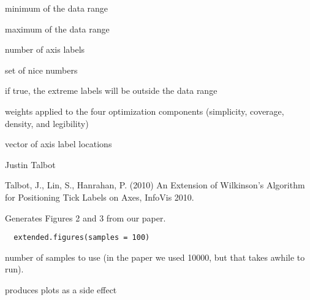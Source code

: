 \documentclass[letterpaper]{book}
\begin{document}
\begin{Arguments}
\begin{ldescription}
\item[\code{dmin}] minimum of the data range

\item[\code{dmax}] maximum of the data range

\item[\code{m}] number of axis labels

\item[\code{Q}] set of nice numbers

\item[\code{only.loose}] if true, the extreme labels will be
outside the data range

\item[\code{w}] weights applied to the four optimization
components (simplicity, coverage, density, and
legibility)
\end{ldescription}
\end{Arguments}
%
\begin{Value}
vector of axis label locations
\end{Value}
%
\begin{Author}\relax
Justin Talbot 
\end{Author}
%
\begin{References}\relax
Talbot, J., Lin, S., Hanrahan, P. (2010) An Extension of
Wilkinson's Algorithm for Positioning Tick Labels on
Axes, InfoVis 2010.
\end{References}
%
\begin{Description}\relax
Generates Figures 2 and 3 from our paper.
\end{Description}
%
\begin{Usage}
\begin{verbatim}
  extended.figures(samples = 100)
\end{verbatim}
\end{Usage}
%
\begin{Arguments}
\begin{ldescription}
\item[\code{samples}] number of samples to use (in the paper we
used 10000, but that takes awhile to run).
\end{ldescription}
\end{Arguments}
%
\begin{Value}
produces plots as a side effect
\end{Value}
\end{document}
